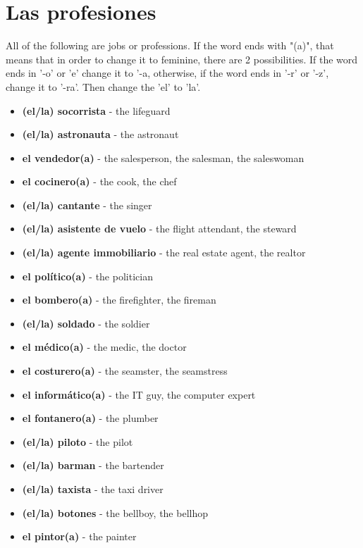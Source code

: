 \documentclass[12pt]{article}
\begin{document}
    \section{Las profesiones}
        All of the following are jobs or professions. If the word ends with "(a)", that means that
        in order to change it to feminine, there are 2 possibilities. If the word ends in '-o' or 'e'
        change it to '-a, otherwise, if the word ends in '-r' or '-z', change it to '-ra'. Then change the 'el' to 'la'.
        \begin{itemize}
            \item \textbf{(el/la) socorrista} - the lifeguard
            \item \textbf{(el/la) astronauta} - the astronaut
            \item \textbf{el vendedor(a)} - the salesperson, the salesman, the saleswoman
            \item \textbf{el cocinero(a)} - the cook, the chef
            \item \textbf{(el/la) cantante} - the singer
            \item \textbf{(el/la) asistente de vuelo} - the flight attendant, the steward
            \item \textbf{(el/la) agente immobiliario} - the real estate agent, the realtor
            \item \textbf{el político(a)} - the politician
            \item \textbf{el bombero(a)} - the firefighter, the fireman
            \item \textbf{(el/la) soldado} - the soldier
            \item \textbf{el médico(a)} - the medic, the doctor
            \item \textbf{el costurero(a)} - the seamster, the seamstress
            \item \textbf{el informático(a)} - the IT guy, the computer expert
            \item \textbf{el fontanero(a)} - the plumber
            \item \textbf{(el/la) piloto} - the pilot
            \item \textbf{(el/la) barman} - the bartender
            \item \textbf{(el/la) taxista} - the taxi driver
            \item \textbf{(el/la) botones} - the bellboy, the bellhop
            \item \textbf{el pintor(a)} - the painter

\end{itemize}
\end{document}

